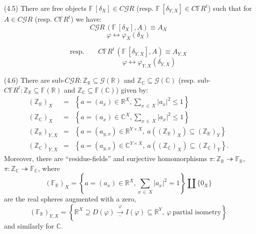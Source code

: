 \documentclass[leqno]{article}
\numberwithin{equation}{section}
\begin{document}
\bigskip

\noindent (4.5) \quad There are free objects ${\mathbb F} \, [\delta_X] \in C{\mathcal G} R$ (resp. ${\mathbb F} \, [\delta_{Y,X}] \in C{\mathbb F} R^t$) such that for $A \in C{\mathcal G} R$ (resp. $C{\mathbb F} R^t$) we have:
$$
C{\mathcal G} R \, ({\mathbb F} \, [\delta_X] , A) \equiv A_X
$$
$$
\varphi \longleftrightarrow \varphi_X (\delta_X)
$$

$$
\mbox{resp.} \qquad C{\mathbb F} R^t \, ({\mathbb F} \, [\delta_{Y,X}] , A) \equiv A_{Y,X}
$$
$$
\qquad \qquad \qquad \varphi \longleftrightarrow \varphi_{Y,X} (\delta_{Y,X})
$$

\medskip

\noindent (4.6) \quad There are sub-$C{\mathcal G} R : {\mathbb Z}_{\mathbb R} \subseteq {\mathcal G} ({\mathbb R})$ and ${\mathbb Z}_{\mathbb C} \subseteq {\mathcal G} ({\mathbb C})$ (resp. sub-$C{\mathbb F} R^t : {\mathbb Z}_{\mathbb R} \subseteq {\mathbb F} ({\mathbb R})$ and ${\mathbb Z}_{\mathbb C} \subseteq {\mathbb F} ({\mathbb C})$) given by:
\begin{eqnarray}
({\mathbb Z}_{\mathbb R})_X &= &\left\{ a = (a_x) \in {\mathbb R}^X , \sum_{x \, \in \, X} \vert a_x \vert^2 \leq 1 \right\} \nonumber \\
({\mathbb Z}_{\mathbb C})_X &= &\left\{ a = (a_x) \in {\mathbb C}^X , \sum_{x \, \in \, X} \vert a_x \vert^2 \leq 1 \right\} \nonumber \\
({\mathbb Z}_{\mathbb R})_{Y,X} &= &\left\{ a = (a_{y,x}) \in {\mathbb R}^{Y \times X} , \ a (({\mathbb Z}_{\mathbb R})_X) \subseteq ({\mathbb Z}_{\mathbb R})_Y \right\} \nonumber \\
({\mathbb Z}_{\mathbb C})_{Y,X} &= &\left\{ a = (a_{y,x}) \in {\mathbb C}^{Y \times X} , \ a (({\mathbb Z}_{\mathbb C})_X) \subseteq ({\mathbb Z}_{\mathbb C})_Y \right\} . \nonumber
\end{eqnarray}
Moreover, there are ``residue-fields'' and surjective homomorphisms $\pi : {\mathbb Z}_{\mathbb R} \twoheadrightarrow {\mathbb F}_{\mathbb R}$, $\pi : {\mathbb Z}_{\mathbb C} \twoheadrightarrow {\mathbb F}_{\mathbb C}$, where
$$
({\mathbb F}_{\mathbb R})_X = \left\{ a = (a_x) \in {\mathbb R}^X , \sum_{x \, \in \, X} \vert a_x \vert^2 = 1 \right\} \amalg \{0_X\}
$$
are the real spheres augmented with a zero,
$$
({\mathbb F}_{\mathbb R})_{Y,X} = \left\{ {\mathbb R}^X \supseteq D(\varphi) \underset{^\sim}{\overset{\varphi}{\longrightarrow}}  I(\varphi) \subseteq {\mathbb R}^Y , \ \varphi \ \mbox{partial isometry} \right\}
$$
and similarly for ${\mathbb C}$. 
\end{document}
